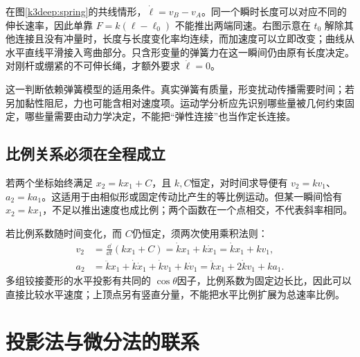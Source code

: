 在图\ref{k3deep:spring}的共线情形，$\dot\ell=v_B-v_A$。同一个瞬时长度可以对应不同的伸长速率，因此单靠 $F=k(\ell-\ell_0)$ 不能推出两端同速。右图示意在 $t_0$ 解除其他连接且没有冲量时，长度与长度变化率均连续，而加速度可以立即改变；曲线从水平直线平滑接入弯曲部分。只含形变量的弹簧力在这一瞬间仍由原有长度决定。对刚杆或绷紧的不可伸长绳，才额外要求 $\dot\ell=0$。

这一判断依赖弹簧模型的适用条件。真实弹簧有质量，形变扰动传播需要时间；若另加黏性阻尼，力也可能含相对速度项。运动学分析应先识别哪些量被几何约束固定，哪些量需要由动力学决定，不能把“弹性连接”也当作定长连接。

\subsection{比例关系必须在全程成立}
若两个坐标始终满足 $x_2=kx_1+C$，且 $k,C$恒定，对时间求导便有 $v_2=kv_1$、$a_2=ka_1$。这适用于由相似形或固定传动比产生的等比例运动。但某一瞬间恰有 $x_2=kx_1$，不足以推出速度也成比例；两个函数在一个点相交，不代表斜率相同。

若比例系数随时间变化，而 $C$仍恒定，须两次使用乘积法则：
\begin{align*}
 v_2&=\frac{\dd}{\dd t}(kx_1+C)=\dot kx_1+k\dot x_1
 =\dot kx_1+kv_1,\\
 a_2&=\ddot kx_1+\dot k\dot x_1+\dot kv_1+k\dot v_1
 =\ddot kx_1+2\dot kv_1+ka_1.
\end{align*}
多组铰接菱形的水平投影有共同的 $\cos\theta$因子，比例系数为固定边长比，因此可以直接比较水平速度；上顶点另有竖直分量，不能把水平比例扩展为总速率比例。

\section{投影法与微分法的联系}
